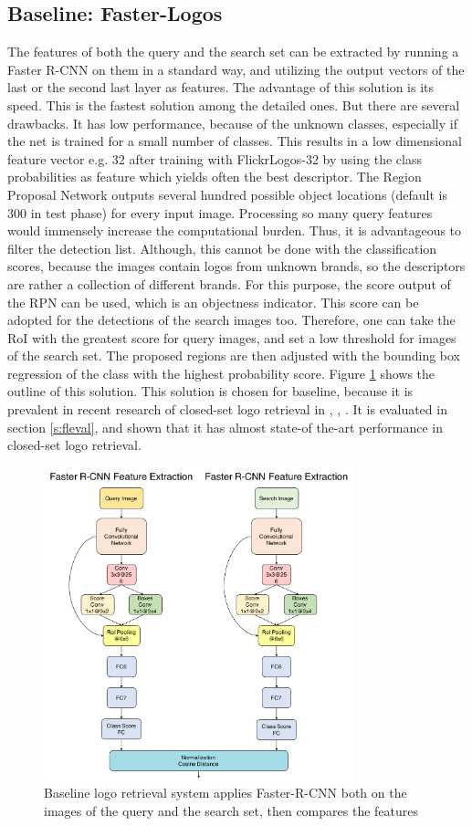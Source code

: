 \subsection{Baseline: Faster-Logos}\label{ss:solution1}
The features of both the query and the search set can be extracted by running a Faster R-CNN on them in a standard way, and utilizing the output vectors of the last or the second last layer as features. The advantage of this solution is its speed. This is the fastest solution among the detailed ones. But there are several drawbacks. It has low performance, because of the unknown classes, especially if the net is trained for a small number of classes. This results in a low dimensional feature vector e.g. 32 after training with FlickrLogos-32 by using the class probabilities as feature which yields often the best descriptor.
\bigbreak
The Region Proposal Network outputs several hundred possible object locations (default is 300 in test phase) for every input image. Processing so many query features would immensely increase the computational burden. Thus, it is advantageous to filter the detection list. Although, this cannot be done with the classification scores, because the images contain logos from unknown brands, so the descriptors are rather a collection of different brands. For this purpose, the score output of the RPN can be used, which is an objectness indicator. This score can be adopted for the detections of the search images too. Therefore, one can take the RoI with the greatest score for query images, and set a low threshold for images of the search set. The proposed regions are then adjusted with the bounding box regression of the class with the highest probability score. Figure \ref{f:sol1arch} shows the outline of this solution. This solution is chosen for baseline, because it is prevalent in recent research of closed-set logo retrieval in \cite{Bao:2016:RCL:3007669.3007728}, \cite{DBLP:journals/corr/OliveiraFPR16}, \cite{DBLP:journals/spl/QiSWX17}. It is evaluated in section \ref{s:fleval}, and shown that it has almost state-of the-art performance in closed-set logo retrieval.
\begin{figure}
  \centering
  \includegraphics[width=90mm]{images/mt/sol1_arch.pdf}
  \caption{Baseline logo retrieval system applies Faster-R-CNN both on the images of the query and the search set, then compares the features}
  \label{f:sol1arch}
\end{figure}
